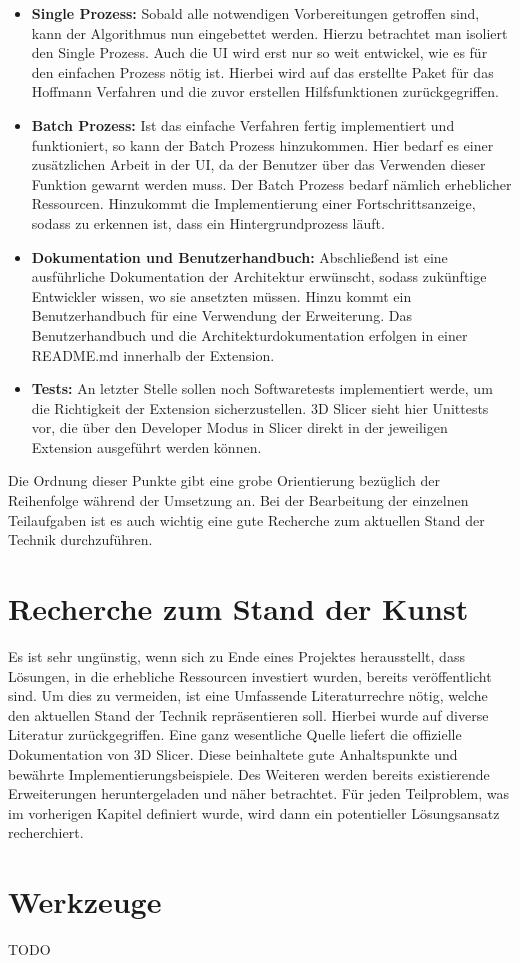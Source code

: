 \begin{itemize}
	\item \textbf{Single Prozess:} Sobald alle notwendigen Vorbereitungen
		getroffen sind, kann der Algorithmus nun eingebettet werden. Hierzu
		betrachtet man isoliert den Single Prozess. Auch die UI wird erst nur so weit
		entwickel, wie es für den einfachen Prozess nötig ist. Hierbei wird auf das erstellte
		Paket für das Hoffmann Verfahren und die zuvor erstellen Hilfsfunktionen zurückgegriffen.

	\item \textbf{Batch Prozess:} Ist das einfache Verfahren fertig implementiert
		und funktioniert, so kann der Batch Prozess hinzukommen. Hier bedarf es
		einer zusätzlichen Arbeit in der UI, da der Benutzer über das Verwenden dieser
		Funktion gewarnt werden muss. Der Batch Prozess bedarf nämlich erheblicher
		Ressourcen. Hinzukommt die Implementierung einer Fortschrittsanzeige, sodass
		zu erkennen ist, dass ein Hintergrundprozess läuft.

	\item \textbf{Dokumentation und Benutzerhandbuch:} Abschließend ist eine
		ausführliche Dokumentation der Architektur erwünscht, sodass zukünftige Entwickler
		wissen, wo sie ansetzten müssen. Hinzu kommt ein Benutzerhandbuch für eine Verwendung
		der Erweiterung. Das Benutzerhandbuch und die Architekturdokumentation
		erfolgen in einer README.md innerhalb der Extension.

	\item \textbf{Tests:} An letzter Stelle sollen noch Softwaretests
		implementiert werde, um die Richtigkeit der Extension sicherzustellen. 3D
		Slicer sieht hier Unittests vor, die über den Developer Modus in Slicer direkt
		in der jeweiligen Extension ausgeführt werden können.
\end{itemize}

Die Ordnung dieser Punkte gibt eine grobe Orientierung bezüglich der Reihenfolge
während der Umsetzung an. Bei der Bearbeitung der einzelnen Teilaufgaben ist es
auch wichtig eine gute Recherche zum aktuellen Stand der Technik durchzuführen.

\section{Recherche zum Stand der Kunst}
Es ist sehr ungünstig, wenn sich zu Ende eines Projektes herausstellt, dass
Lösungen, in die erhebliche Ressourcen investiert wurden, bereits veröffentlicht
sind. Um dies zu vermeiden, ist eine Umfassende Literaturrechre nötig, welche den
aktuellen Stand der Technik repräsentieren soll. Hierbei wurde auf diverse
Literatur zurückgegriffen. Eine ganz wesentliche Quelle liefert die offizielle Dokumentation
von 3D Slicer. Diese beinhaltete gute Anhaltspunkte und bewährte
Implementierungsbeispiele. Des Weiteren werden bereits existierende Erweiterungen
heruntergeladen und näher betrachtet. Für jeden Teilproblem, was im vorherigen
Kapitel definiert wurde, wird dann ein potentieller Lösungsansatz recherchiert.

\section{Werkzeuge}
TODO